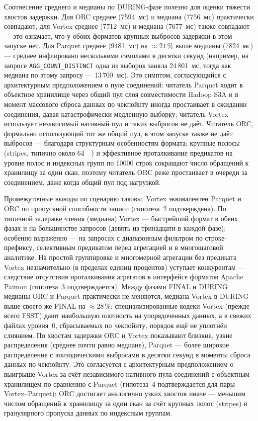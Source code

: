 Соотнесение среднего и
медианы по DURING-фазе полезно для оценки тяжести хвостов задержки. Для ORC
среднее (7594~мс) и медиана (7756~мс) практически совпадают, для Vortex среднее
(7712~мс) и медиана (7677~мс) также совпадают --- это означает, что у обоих
форматов крупных выбросов задержки в этом запуске нет. Для Parquet среднее
(9481~мс) на $\approx 21\,\%$ выше медианы (7824~мс) --- среднее инфлировано
несколькими сэмплами в десятки секунд (например, на запросе
\texttt{AGG\_COUNT\_DISTINCT} одна из выборок заняла 24\,801~мс, тогда как
медиана по этому запросу --- 13\,700~мс). Это симптом, согласующийся с
архитектурным предположением о пуле соединений: читатель Parquet ходит в
объектное хранилище через общий пул слоя совместимости Hadoop S3A и в момент
массового сброса данных по чекпойнту иногда простаивает в ожидании соединения,
давая катастрофически медленную выборку; читатель Vortex использует независимый
нативный пул и таких выбросов не даёт. Читатель ORC, формально использующий тот
же общий пул, в этом запуске также не даёт выбросов --- благодаря структурным
особенностям формата: крупные полосы (stripes, типично около \SI{64}{\mega\byte})
и эффективное проталкивание предикатов на уровне полос и индексных групп по
\num{10000} строк сокращают число обращений к хранилищу за один скан, поэтому
читатель ORC реже простаивает в очереди за соединением, даже когда общий пул под
нагрузкой.

Промежуточные выводы по сценарию таковы. Vortex эквивалентен Parquet и ORC по
пропускной способности записи (гипотеза~2 подтверждена). По типичной задержке
чтения (медиана) Vortex --- быстрейший формат в обеих фазах и на большинстве
запросов (девять из тринадцати в каждой фазе); особенно выраженно --- на запросах
с диапазонным фильтром по строке-префиксу, селективным предикатом перед агрегацией
и в многошаговой аналитике. На простой группировке и многомерной агрегации без
предиката Vortex незначительно (в пределах единиц процентов) уступает конкурентам
--- следствие отсутствия проталкивания агрегатов в интерфейсе форматов Apache
Paimon (гипотеза~3 подтверждается). Между фазами FINAL и DURING медианы ORC и
Parquet практически не меняются, медиана Vortex в DURING выше своего же FINAL на
$\approx 28\,\%$: специализированные кодеки Vortex (прежде всего FSST) дают
наибольшую плотность на упорядоченных данных, а в свежих файлах уровня~0,
сбрасываемых по чекпойнту, порядок ещё не уплотнён слиянием. По хвостам задержки
ORC и Vortex показывают близкие, узкие распределения (среднее почти равно медиане),
Parquet --- более широкое распределение с эпизодическими выбросами в десятки
секунд в моменты сброса данных по чекпойнту. Это согласуется с архитектурным
предположением о выигрыше Vortex за счёт независимого нативного пула соединений с
объектным хранилищем по сравнению с Parquet (гипотеза~4 подтверждается для пары
Vortex--Parquet); ORC достигает аналогично узких хвостов иначе --- меньшим
числом обращений к хранилищу за один скан за счёт крупных полос (stripes) и
гранулярного пропуска данных по индексным группам.
